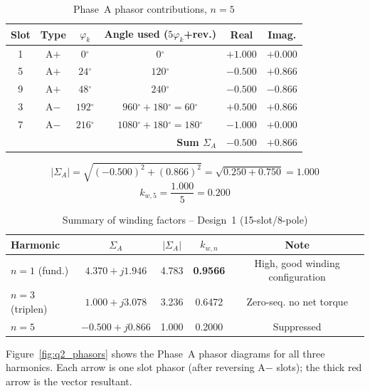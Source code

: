 \documentclass[12pt,a4paper]{article}
\newcommand{\degree}{\ensuremath{^{\circ}}}
\begin{document}
\begin{table}[H]
  \centering\small
  \caption{Phase~A phasor contributions, $n=5$}
  \label{tab:q2_ph5}
  \begin{tabular}{cccccc}
    \toprule
    Slot & Type & $\varphi_k$ & Angle used ($5\varphi_k$+rev.) & Real & Imag. \\
    \midrule
    1 & A$+$ & $  0\degree$ & $   0\degree$                     & $+1.000$ & $+0.000$ \\
    5 & A$+$ & $ 24\degree$ & $ 120\degree$                     & $-0.500$ & $+0.866$ \\
    9 & A$+$ & $ 48\degree$ & $ 240\degree$                     & $-0.500$ & $-0.866$ \\
    3 & A$-$ & $192\degree$ & $960\degree+180\degree=60\degree$  & $+0.500$ & $+0.866$ \\
    7 & A$-$ & $216\degree$ & $1080\degree+180\degree=180\degree$& $-1.000$ & $+0.000$ \\
    \midrule
    \multicolumn{4}{r}{\textbf{Sum $\Sigma_A$}} & $-0.500$ & $+0.866$ \\
    \bottomrule
  \end{tabular}
\end{table}
\begin{equation}
  |\Sigma_A| = \sqrt{(-0.500)^2 + (0.866)^2} = \sqrt{0.250 + 0.750} = 1.000
\end{equation}
\begin{equation}
  \boxed{k_{w,5} = \frac{1.000}{5} = 0.200}
\end{equation}



\begin{table}[H]
  \centering
  \caption{Summary of winding factors -- Design~1 (15-slot/8-pole)}
  \label{tab:q2_kw}
  \begin{tabular}{lcccc}
    \toprule
    Harmonic & $\Sigma_A$ & $|\Sigma_A|$ & $k_{w,n}$ & Note \\
    \midrule
    $n=1$ (fund.) & $4.370+j1.946$ & 4.783 & \textbf{0.9566} & High, good winding configuration \\
    $n=3$ (triplen) & $1.000+j3.078$ & 3.236 & 0.6472 & Zero-seq. no net torque \\
    $n=5$ & $-0.500+j0.866$ & 1.000 & 0.2000 & Suppressed \\
    \bottomrule
  \end{tabular}
\end{table}

Figure~\ref{fig:q2_phasors} shows the Phase~A phasor diagrams for all three
harmonics.
Each arrow is one slot phasor (after reversing A$-$ slots);
the thick red arrow is the vector resultant.
\end{document}
